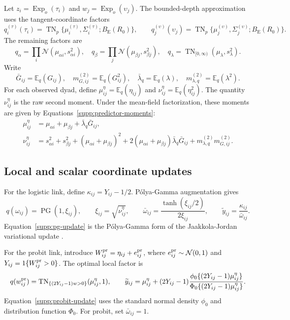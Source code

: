 \documentclass[
  12pt]{article}
\theoremstyle{definition}
\theoremstyle{plain}
\newcommand{\E}{\mathbb E}
\newcommand{\TN}{\operatorname{TN}}
\newcommand{\PG}{\operatorname{PG}}
\newcommand{\Normal}{\mathcal N}
\DeclareMathOperator{\Exp}{Exp}
\begin{document}
Let $z_i=\Exp_o(\tau_i)$ and $w_j=\Exp_o(\upsilon_j)$. The bounded-depth approximation uses the tangent-coordinate factors
\[
q_i^{(\tau)}(\tau_i)=\TN_p\{\mu_i^{(\tau)},\Sigma_i^{(\tau)};B_{\mathrm E}(R_0)\},
\qquad
q_j^{(\upsilon)}(\upsilon_j)=\TN_p\{\mu_j^{(\upsilon)},\Sigma_j^{(\upsilon)};B_{\mathrm E}(R_0)\}.
\]
The remaining factors are
\[
q_\alpha=\prod_i\Normal(\mu_{\alpha i},s_{\alpha i}^2),
\quad
q_\beta=\prod_j\Normal(\mu_{\beta j},s_{\beta j}^2),
\quad
q_\lambda=\TN_{[0,\infty)}(\mu_\lambda,s_\lambda^2).
\]
Write
\[
\bar G_{ij}=\E_q(G_{ij}),
\quad
m_{G,ij}^{(2)}=\E_q(G_{ij}^2),
\quad
\bar\lambda_q=\E_q(\lambda),
\quad
m_{\lambda,q}^{(2)}=\E_q(\lambda^2).
\]
For each observed dyad, define $\mu_{ij}^{\eta}=\E_q(\eta_{ij})$ and $\nu_{ij}^{\eta}=\E_q(\eta_{ij}^2)$. The quantity $\nu_{ij}^{\eta}$ is the raw second moment. Under the mean-field factorization, these moments are given by Equations~\eqref{supp:predictor-moments}:
\begin{subequations}\label{supp:predictor-moments}
	\begin{align}
		\mu_{ij}^{\eta}
		&=\mu_{\alpha i}+\mu_{\beta j}+\bar\lambda_q\bar G_{ij},\\
		\nu_{ij}^{\eta}
		&=s_{\alpha i}^2+s_{\beta j}^2+(\mu_{\alpha i}+\mu_{\beta j})^2
		+2(\mu_{\alpha i}+\mu_{\beta j})\bar\lambda_q\bar G_{ij}
		+m_{\lambda,q}^{(2)}m_{G,ij}^{(2)}.
	\end{align}
\end{subequations}

\subsection{Local and scalar coordinate updates}

For the logistic link, define $\kappa_{ij}=Y_{ij}-1/2$. P\'olya-Gamma augmentation gives
\begin{equation}\label{supp:pg-update}
	q(\omega_{ij})=\PG(1,\xi_{ij}),
	\qquad
	\xi_{ij}=\sqrt{\nu_{ij}^{\eta}},
	\qquad
	\bar\omega_{ij}=\frac{\tanh(\xi_{ij}/2)}{2\xi_{ij}},
	\qquad
	\widetilde y_{ij}=\frac{\kappa_{ij}}{\bar\omega_{ij}}.
\end{equation}
Equation~\eqref{supp:pg-update} is the P\'olya-Gamma form of the Jaakkola-Jordan variational update \citep{jaakkola_2000_BayesianParameterEstimation,polson_2013_BayesianInferenceLogistic,durante_2019_ConditionallyConjugateMeanField}.

For the probit link, introduce $W_{ij}^{\rm pr}=\eta_{ij}+e_{ij}^{\rm pr}$, where $e_{ij}^{\rm pr}\sim\Normal(0,1)$ and $Y_{ij}=1\{W_{ij}^{\rm pr}>0\}$. The optimal local factor is
\begin{equation}\label{supp:probit-update}
	q(w_{ij}^{\rm pr})=\TN_{\{(2Y_{ij}-1)w>0\}}(\mu_{ij}^{\eta},1),
	\qquad
	\widetilde y_{ij}=\mu_{ij}^{\eta}+(2Y_{ij}-1)
	\frac{\phi_0\{(2Y_{ij}-1)\mu_{ij}^{\eta}\}}
	{\Phi_0\{(2Y_{ij}-1)\mu_{ij}^{\eta}\}}.
\end{equation}
Equation~\eqref{supp:probit-update} uses the standard normal density $\phi_0$ and distribution function $\Phi_0$. For probit, set $\bar\omega_{ij}=1$.
\end{document}
